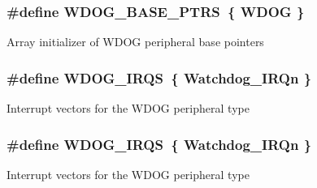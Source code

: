 \subsubsection[{\texorpdfstring{W\+D\+O\+G\+\_\+\+B\+A\+S\+E\+\_\+\+P\+T\+RS}{WDOG_BASE_PTRS}}]{\setlength{\rightskip}{0pt plus 5cm}\#define W\+D\+O\+G\+\_\+\+B\+A\+S\+E\+\_\+\+P\+T\+RS~\{ {\bf W\+D\+OG} \}}\hypertarget{group__WDOG__Peripheral__Access__Layer_ga8d50dba3756857eed1783b3d726d40d8}{}\label{group__WDOG__Peripheral__Access__Layer_ga8d50dba3756857eed1783b3d726d40d8}
Array initializer of W\+D\+OG peripheral base pointers 
\subsubsection[{\texorpdfstring{W\+D\+O\+G\+\_\+\+I\+R\+QS}{WDOG_IRQS}}]{\setlength{\rightskip}{0pt plus 5cm}\#define W\+D\+O\+G\+\_\+\+I\+R\+QS~\{ {\bf Watchdog\+\_\+\+I\+R\+Qn} \}}\hypertarget{group__WDOG__Peripheral__Access__Layer_gad44cf9ab5d5c2116869c5570758d4eeb}{}\label{group__WDOG__Peripheral__Access__Layer_gad44cf9ab5d5c2116869c5570758d4eeb}
Interrupt vectors for the W\+D\+OG peripheral type 
\subsubsection[{\texorpdfstring{W\+D\+O\+G\+\_\+\+I\+R\+QS}{WDOG_IRQS}}]{\setlength{\rightskip}{0pt plus 5cm}\#define W\+D\+O\+G\+\_\+\+I\+R\+QS~\{ {\bf Watchdog\+\_\+\+I\+R\+Qn} \}}\hypertarget{group__WDOG__Peripheral__Access__Layer_gad44cf9ab5d5c2116869c5570758d4eeb}{}\label{group__WDOG__Peripheral__Access__Layer_gad44cf9ab5d5c2116869c5570758d4eeb}
Interrupt vectors for the W\+D\+OG peripheral type 